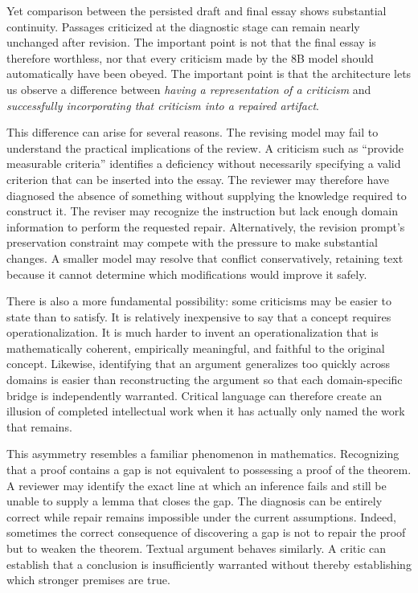 \documentclass[11pt]{article}
\begin{document}
Yet comparison between the persisted draft and final essay shows substantial continuity. Passages criticized at the diagnostic stage can remain nearly unchanged after revision. The important point is not that the final essay is therefore worthless, nor that every criticism made by the 8B model should automatically have been obeyed. The important point is that the architecture lets us observe a difference between \emph{having a representation of a criticism} and \emph{successfully incorporating that criticism into a repaired artifact}.

This difference can arise for several reasons. The revising model may fail to understand the practical implications of the review. A criticism such as ``provide measurable criteria'' identifies a deficiency without necessarily specifying a valid criterion that can be inserted into the essay. The reviewer may therefore have diagnosed the absence of something without supplying the knowledge required to construct it. The reviser may recognize the instruction but lack enough domain information to perform the requested repair. Alternatively, the revision prompt's preservation constraint may compete with the pressure to make substantial changes. A smaller model may resolve that conflict conservatively, retaining text because it cannot determine which modifications would improve it safely.

There is also a more fundamental possibility: some criticisms may be easier to state than to satisfy. It is relatively inexpensive to say that a concept requires operationalization. It is much harder to invent an operationalization that is mathematically coherent, empirically meaningful, and faithful to the original concept. Likewise, identifying that an argument generalizes too quickly across domains is easier than reconstructing the argument so that each domain-specific bridge is independently warranted. Critical language can therefore create an illusion of completed intellectual work when it has actually only named the work that remains.

This asymmetry resembles a familiar phenomenon in mathematics. Recognizing that a proof contains a gap is not equivalent to possessing a proof of the theorem. A reviewer may identify the exact line at which an inference fails and still be unable to supply a lemma that closes the gap. The diagnosis can be entirely correct while repair remains impossible under the current assumptions. Indeed, sometimes the correct consequence of discovering a gap is not to repair the proof but to weaken the theorem. Textual argument behaves similarly. A critic can establish that a conclusion is insufficiently warranted without thereby establishing which stronger premises are true.
\end{document}
